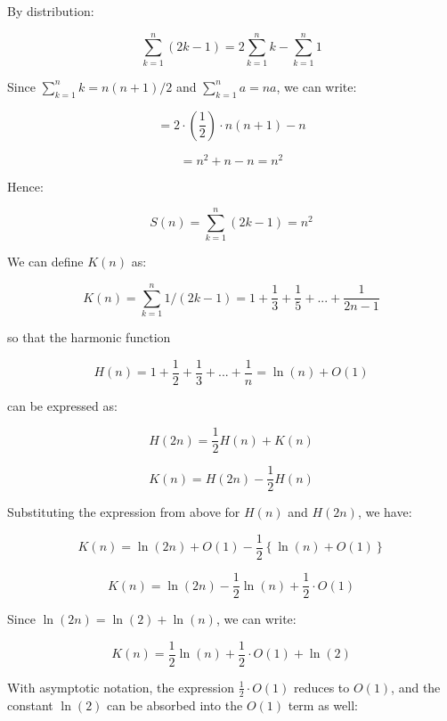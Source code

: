 \documentclass[a4paper,12pt]{article}
\begin{document}

By distribution: 

\[ \sum_{k=1}^n (2k-1) = 2\sum_{k=1}^n k - \sum_{k=1}^n  1\]

Since $\sum_{k=1}^n k = n(n+1)/2$ and $\sum_{k=1}^n a = n a$, we can write:

\[ = 2\cdot\left( \frac{1}{2} \right) \cdot n \left(n+1\right) - n\]

\[ = n^2 + n - n = n^2 \]

Hence:

\[ S(n) = \sum_{k=1}^n (2k-1)  = n^2 \]


We can define $K(n)$ as:

\[ K(n) = \sum_{k=1}^n 1 / \left(2k-1\right) = 1 + \frac{1}{3} + \frac{1}{5} + ... + \frac{1}{2n-1}\]

so that the harmonic function

\[ H(n) = 1 + \frac{1}{2} + \frac{1}{3} + ... + \frac{1}{n} = \ln(n) + O(1) \]

can be expressed as: 

\[ H(2n) = \frac{1}{2} H(n) + K(n) \]

\[ K(n) = H(2n) - \frac{1}{2} H(n) \]

Substituting the expression from above for $H(n)$ and $H(2n)$, we have:

\[ K(n) =  \ln(2n) + O(1) - \frac{1}{2} \left\{ \ln(n) + O(1) \right\}  \]

\[ K(n) = \ln(2n) - \frac{1}{2}\ln(n) + \frac{1}{2} \cdot O(1) \] 

Since $\ln(2n) = \ln(2) + \ln(n)$, we can write: 

\[ K(n) = \frac{1}{2} \ln(n) + \frac{1}{2}\cdot O(1) + \ln(2) \]

With asymptotic notation, the expression $\frac{1}{2} \cdot O(1)$ reduces to $O(1)$, and the constant $\ln(2)$ can be absorbed into the $O(1)$ term as well:
\end{document}
